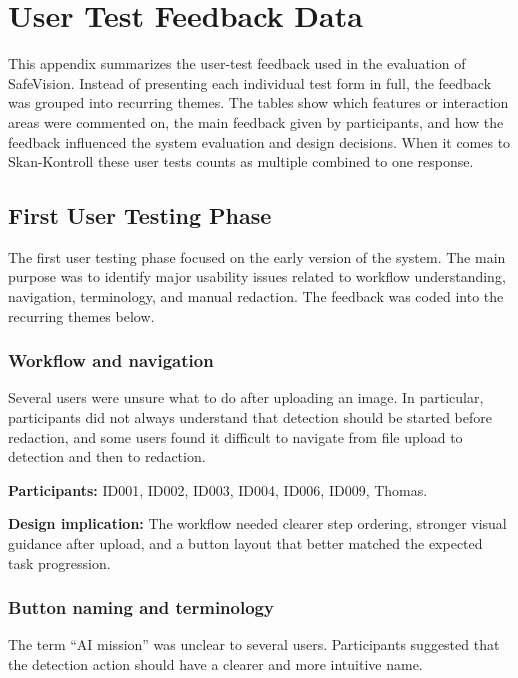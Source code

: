 \chapter{User Test Feedback Data}
\label{appendix:user_test_feedback}

This appendix summarizes the user-test feedback used in the evaluation of SafeVision. Instead of presenting each individual test form in full, the feedback was grouped into recurring themes. The tables show which features or interaction areas were commented on, the main feedback given by participants, and how the feedback influenced the system evaluation and design decisions. When it comes to Skan-Kontroll these user tests counts as multiple combined to one response.

\section{First User Testing Phase}
\label{app:user_test_phase_1}

The first user testing phase focused on the early version of the system. The
main purpose was to identify major usability issues related to workflow
understanding, navigation, terminology, and manual redaction. The feedback was
coded into the recurring themes below.

\subsection*{Workflow and navigation}

Several users were unsure what to do after uploading an image. In particular,
participants did not always understand that detection should be started before
redaction, and some users found it difficult to navigate from file upload to
detection and then to redaction.

\textbf{Participants:} ID001, ID002, ID003, ID004, ID006, ID009, Thomas.

\textbf{Design implication:} The workflow needed clearer step ordering, stronger
visual guidance after upload, and a button layout that better matched the
expected task progression.

\subsection*{Button naming and terminology}

The term ``AI mission'' was unclear to several users. Participants suggested
that the detection action should have a clearer and more intuitive name.

